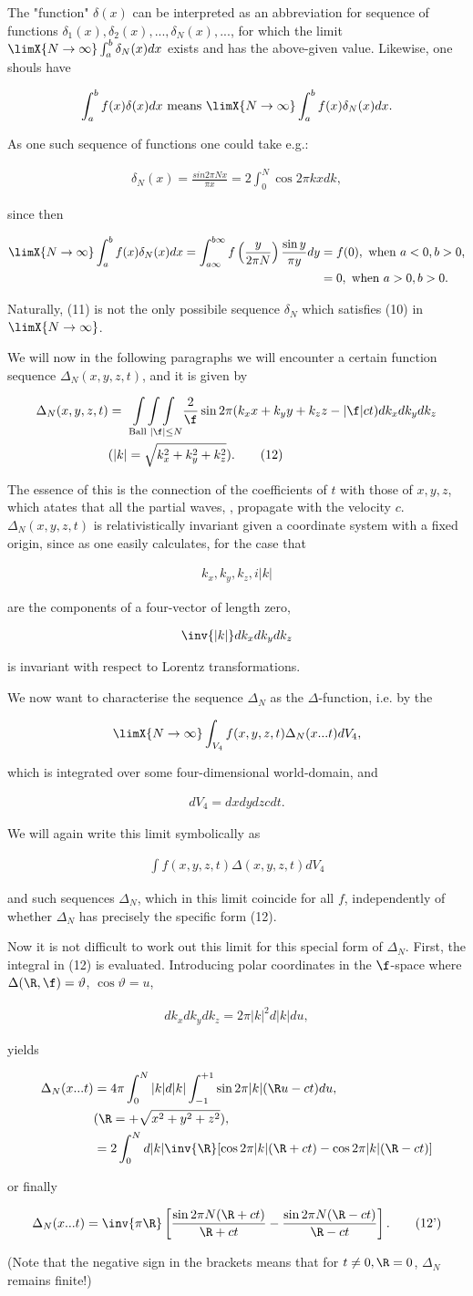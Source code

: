 \documentclass{article}
\newcommand{\nequ}[2]{
\begin{align*}
#1
\tag{#2}
\end{align*}
}
\newcommand{\uequ}[1]{
\begin{align*}
#1
\end{align*}
}
\begin{document}
The "function" $\delta(x)$ can be interpreted as an abbreviation for sequence of functions $\delta_1(x), \delta_2(x),...,\delta_N(x),...$, for which the limit $\limX{N\to\infty}\int_a^b \delta_N(x) dx$ exists and has the above-given value. Likewise, one shouls have
\uequ{
\int_a^b f(x)\delta(x)dx \text{ means } \limX{N\to\infty}\int_a^b f(x)\delta_N(x)dx.
}
As one such sequence of functions one could take e.g.:
\nequ{
\delta_N(x) = \frac{sin{2\pi N x}}{\pi x} =
2 \int_0^N \cos{2\pi k x} dk,
}{11}

since then
\uequ{
\limX{N\to\infty} \int_a^b f(x)\delta_N(x)dx = 
\int_{a\infty}^{b\infty}f\left(\frac{y}{2\pi N}\right)\frac{\sin{y}}{\pi y}dy
&= f(0), \text{ when } a < 0, b > 0, \\
&= 0, \text{ when } a > 0, b > 0.
}
Naturally, (11) is not the only possibile sequence $\delta_N$ which satisfies (10) in $\limX{N\to\infty}$.

We will now in the following paragraphs we will encounter a certain function sequence $\Delta_N(x,y,z,t)$, and it is given by
\nequ{
\Delta_N(x,y,z,t) &= \underset{\text{ Ball }|\f|\leq N}{\int\int\int}
\frac{2}{\f}\sin{2\pi(k_x x + k_y y + k_z z - |\f|ct)} dk_x dk_y dk_z\\
&(|k| = \sqrt{k_x^2 + k_y^2 + k_z^2}).
}{12}

The essence of this is the connection of the coefficients of $t$ with those of $x,y,z$, which atates that all the partial waves, , propagate with the velocity $c$. $\Delta_N(x,y,z,t)$ is relativistically invariant given a coordinate system with a fixed origin, since as one easily calculates, for the case that
\uequ{
k_x,k_y,k_z,i|k|
}
are the components of a four-vector of length zero,
\uequ{
\inv{|k|}dk_x dk_y dk_z
}
is invariant with respect to Lorentz transformations.

We now want to characterise the sequence $\Delta_N$ as the $\Delta$-function, i.e. by the
\uequ{
\limX{N\to\infty}\int_{V_4}f(x,y,z,t)\Delta_N(x...t) dV_4,
}
which is integrated over some four-dimensional world-domain, and
\uequ{
dV_4 = dx dy dz c dt.
}
We will again write this limit symbolically as
\uequ{
\int f(x,y,z,t)\Delta(x,y,z,t)dV_4
}
and such sequences $\Delta_N$, which in this limit coincide for all $f$, independently of whether $\Delta_N$ has precisely the specific form (12).

Now it is not difficult to work out this limit for this special form of $\Delta_N$. First, the integral in (12) is evaluated. Introducing polar coordinates in the $\f$-space where $\Delta(\R,\f)=\vartheta$, $\cos\vartheta = u$,
\uequ{
dk_x dk_y dk_z = 2\pi |k|^2 d|k| du,
}
yields
\uequ{
\Delta_N(x...t) &= 4\pi\int_0^N |k| d|k| \int_{-1}^{+1}\sin{2\pi |k| (\R u - ct)} du,\\
&(\R = +\sqrt{x^2+y^2+z^2}),\\
 &= 2\int_0^N d|k| \inv{\R} [\cos{2\pi|k|(\R+ct)} - \cos{2\pi |k|(\R-ct)}]
}
or finally
\nequ{
\Delta_N(x...t) = \inv{\pi\R}\left[
\frac{\sin{2\pi N(\R+ct)}}{\R+ct} - \frac{\sin{2\pi N(\R-ct)}}{\R-ct}
\right].
}{12'}
(Note that the negative sign in the brackets means that for $t\neq 0,\R=0$, $\Delta_N$ remains finite!)
\end{document}
